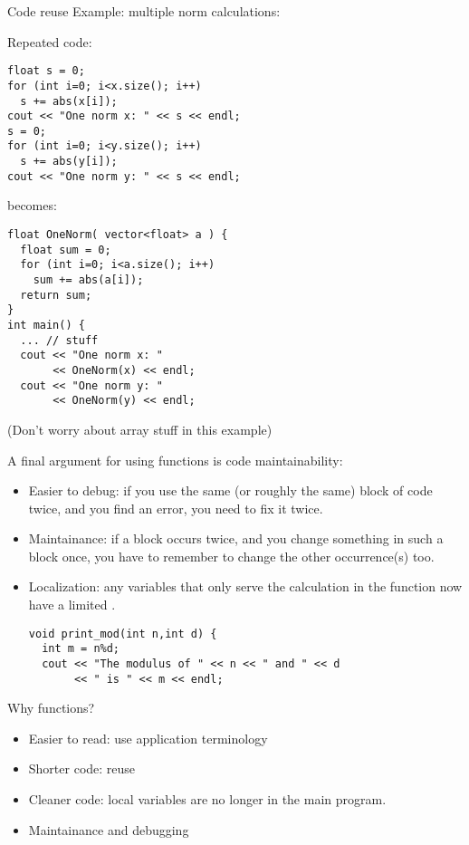 \begin{block}{Code reuse}
  \label{sl:function-reuse}
Example: multiple norm calculations:
  \begin{multicols}{2}
    \small
    Repeated code:
\begin{lstlisting}
float s = 0;
for (int i=0; i<x.size(); i++)
  s += abs(x[i]);
cout << "One norm x: " << s << endl;
s = 0;
for (int i=0; i<y.size(); i++)
  s += abs(y[i]);
cout << "One norm y: " << s << endl;
\end{lstlisting}
\vfill\columnbreak
becomes:
\begin{lstlisting}
float OneNorm( vector<float> a ) {
  float sum = 0;
  for (int i=0; i<a.size(); i++)
    sum += abs(a[i]);
  return sum;
}
int main() {
  ... // stuff
  cout << "One norm x: "
       << OneNorm(x) << endl;
  cout << "One norm y: " 
       << OneNorm(y) << endl;
\end{lstlisting}
  \end{multicols}
  (Don't worry about array stuff in this example)
\end{block}

A final argument for using functions is code maintainability:
\begin{itemize}
\item Easier to debug: if you use the same (or roughly the same) block
  of code twice, and you find an error, you need to fix it twice.
\item Maintainance: if a block occurs twice, and  you change something in such a block
  once, you have to remember to change the other occurrence(s) too.
\item Localization: any variables that only serve the calculation in
  the function now have a limited .
\begin{lstlisting}
void print_mod(int n,int d) {
  int m = n%d;
  cout << "The modulus of " << n << " and " << d 
       << " is " << m << endl;
\end{lstlisting}
\end{itemize}

\begin{slide}{Why functions?}
  \label{sl:func-why}
  \begin{itemize}
  \item Easier to read: use application terminology
  \item Shorter code: reuse
  \item Cleaner code: local variables are no longer in the main program.
  \item Maintainance and debugging
  \end{itemize}
\end{slide}

